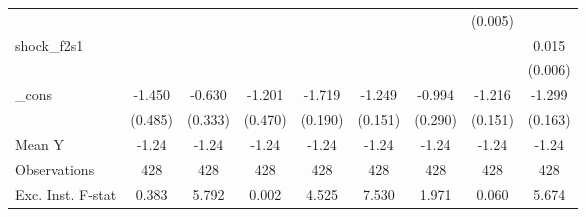 {\begin{tabular}{l*{8}{c}}
            &                     &                     &                     &                     &                     &                     &     (0.005)         &                     \\
\addlinespace
shock\_f2s1  &                     &                     &                     &                     &                     &                     &                     &       0.015\sym{**} \\
            &                     &                     &                     &                     &                     &                     &                     &     (0.006)         \\
\addlinespace
\_cons      &      -1.450\sym{***}&      -0.630\sym{*}  &      -1.201\sym{**} &      -1.719\sym{***}&      -1.249\sym{***}&      -0.994\sym{***}&      -1.216\sym{***}&      -1.299\sym{***}\\
            &     (0.485)         &     (0.333)         &     (0.470)         &     (0.190)         &     (0.151)         &     (0.290)         &     (0.151)         &     (0.163)         \\
\midrule
Mean Y      &       -1.24         &       -1.24         &       -1.24         &       -1.24         &       -1.24         &       -1.24         &       -1.24         &       -1.24         \\
Observations&         428         &         428         &         428         &         428         &         428         &         428         &         428         &         428         \\
Exc. Inst. F-stat&       0.383         &       5.792         &       0.002         &       4.525         &       7.530         &       1.971         &       0.060         &       5.674         \\
\bottomrule
\end{tabular}
}
